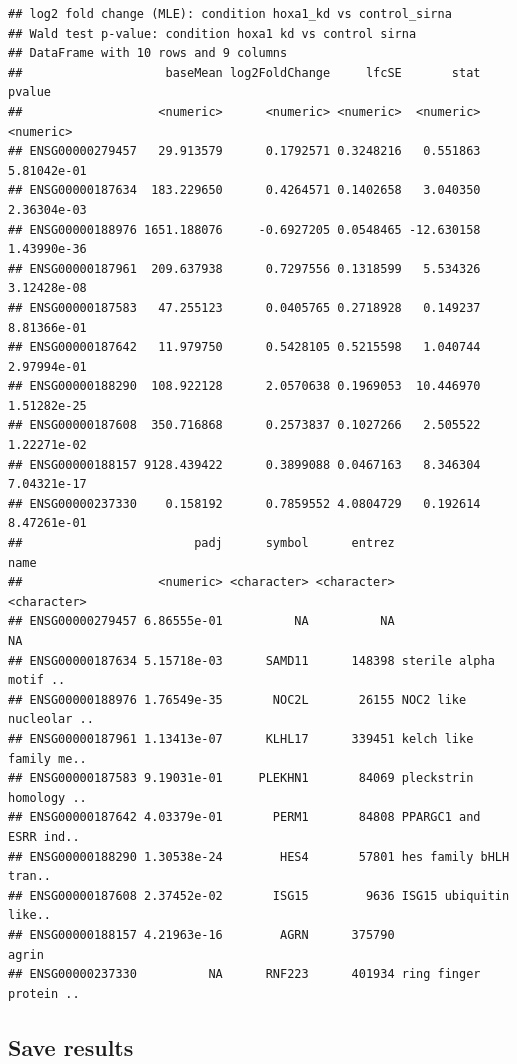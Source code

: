 \documentclass[
]{article}
\newenvironment{Shaded}{\begin{snugshade}}{\end{snugshade}}
\newcommand{\AttributeTok}[1]{\textcolor[rgb]{0.77,0.63,0.00}{#1}}
\newcommand{\FunctionTok}[1]{\textcolor[rgb]{0.00,0.00,0.00}{#1}}
\newcommand{\NormalTok}[1]{#1}
\newcommand{\OtherTok}[1]{\textcolor[rgb]{0.56,0.35,0.01}{#1}}
\newcommand{\SpecialCharTok}[1]{\textcolor[rgb]{0.00,0.00,0.00}{#1}}
\newcommand{\StringTok}[1]{\textcolor[rgb]{0.31,0.60,0.02}{#1}}
\begin{document}
\begin{verbatim}
## log2 fold change (MLE): condition hoxa1_kd vs control_sirna 
## Wald test p-value: condition hoxa1 kd vs control sirna 
## DataFrame with 10 rows and 9 columns
##                    baseMean log2FoldChange     lfcSE       stat      pvalue
##                   <numeric>      <numeric> <numeric>  <numeric>   <numeric>
## ENSG00000279457   29.913579      0.1792571 0.3248216   0.551863 5.81042e-01
## ENSG00000187634  183.229650      0.4264571 0.1402658   3.040350 2.36304e-03
## ENSG00000188976 1651.188076     -0.6927205 0.0548465 -12.630158 1.43990e-36
## ENSG00000187961  209.637938      0.7297556 0.1318599   5.534326 3.12428e-08
## ENSG00000187583   47.255123      0.0405765 0.2718928   0.149237 8.81366e-01
## ENSG00000187642   11.979750      0.5428105 0.5215598   1.040744 2.97994e-01
## ENSG00000188290  108.922128      2.0570638 0.1969053  10.446970 1.51282e-25
## ENSG00000187608  350.716868      0.2573837 0.1027266   2.505522 1.22271e-02
## ENSG00000188157 9128.439422      0.3899088 0.0467163   8.346304 7.04321e-17
## ENSG00000237330    0.158192      0.7859552 4.0804729   0.192614 8.47261e-01
##                        padj      symbol      entrez                   name
##                   <numeric> <character> <character>            <character>
## ENSG00000279457 6.86555e-01          NA          NA                     NA
## ENSG00000187634 5.15718e-03      SAMD11      148398 sterile alpha motif ..
## ENSG00000188976 1.76549e-35       NOC2L       26155 NOC2 like nucleolar ..
## ENSG00000187961 1.13413e-07      KLHL17      339451 kelch like family me..
## ENSG00000187583 9.19031e-01     PLEKHN1       84069 pleckstrin homology ..
## ENSG00000187642 4.03379e-01       PERM1       84808 PPARGC1 and ESRR ind..
## ENSG00000188290 1.30538e-24        HES4       57801 hes family bHLH tran..
## ENSG00000187608 2.37452e-02       ISG15        9636 ISG15 ubiquitin like..
## ENSG00000188157 4.21963e-16        AGRN      375790                  agrin
## ENSG00000237330          NA      RNF223      401934 ring finger protein ..
\end{verbatim}

\hypertarget{save-results}{%
\subsection{Save results}\label{save-results}}

\begin{Shaded}
\end{Shaded}
\end{document}
